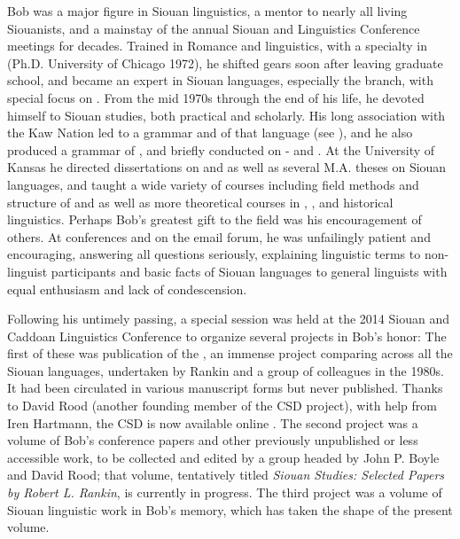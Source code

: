 \begin{refsection}
Bob was a major figure in Siouan linguistics, a mentor to nearly all living Siouanists, and a mainstay of the annual Siouan and  Linguistics Conference meetings for decades. Trained in Romance and  linguistics, with a specialty in  (Ph.D. University of Chicago 1972), he shifted gears soon after leaving graduate school, and became an expert in Siouan languages, especially the  branch, with special focus on . From the mid 1970s through the end of his life, he devoted himself to Siouan studies, both practical and scholarly. His long association with the Kaw Nation led to a grammar and  of that language (see \citealt{Cumberland2016}), and he also produced a grammar of , and briefly conducted  on - and . At the University of Kansas he directed dissertations on  \citep{Trechter1995} and  \citep{Oliverio1996} as well as several M.A. theses on Siouan languages, and taught a wide variety of courses including field methods and structure of  and  as well as more theoretical courses in , , and historical linguistics. Perhaps Bob's greatest gift to the field was his encouragement of others. At conferences and on the  email forum, he was unfailingly patient and encouraging, answering all questions seriously, explaining linguistic terms to non-linguist participants and basic facts of Siouan languages to general linguists with equal enthusiasm and lack of condescension.

Following his untimely passing, a special session was held at the 2014 Siouan and Caddoan Linguistics Conference to organize several projects in Bob's honor: The first of these was publication of the , an immense project comparing  across all the Siouan languages, undertaken by Rankin and a group of colleagues in the 1980s. It had been circulated in various manuscript forms but never published. Thanks to David Rood (another founding member of the CSD project), with help from Iren Hartmann, the CSD is now available online \citep{RankinEtAl2015AccessSeptember}. The second project was a volume of Bob's conference papers and other previously unpublished or less accessible work, to be collected and edited by a group headed by John P. Boyle and David Rood; that volume, tentatively titled \textit{Siouan Studies: Selected Papers by Robert L. Rankin}, is currently in progress. The third project was a volume of Siouan linguistic work in Bob's memory, which has taken the shape of the present volume.

\printbibliography[heading=subbibliography,notkeyword=this]

%

\end{refsection}

